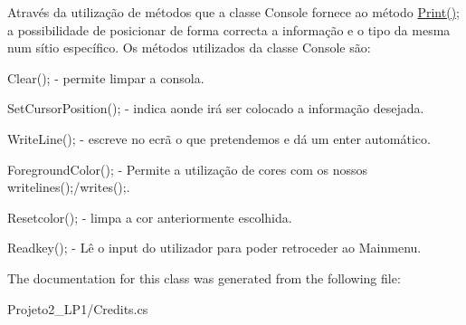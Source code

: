 Através da utilização de métodos que a classe Console fornece ao método \mbox{\hyperlink{class_projeto2___l_p1_1_1_credits_a34a88547053660a821523f26d0d47230}{Print()}}; a possibilidade de posicionar de forma correcta a informação e o tipo da mesma num sítio específico. Os métodos utilizados da classe Console são\+: 


\begin{DoxyItemize}
\item Clear(); -\/ permite limpar a consola.
\item Set\+Cursor\+Position(); -\/ indica aonde irá ser colocado a informação desejada.
\item Write\+Line(); -\/ escreve no ecrã o que pretendemos e dá um enter automático.
\item Foreground\+Color(); -\/ Permite a utilização de cores com os nossos writelines();/writes();.
\item Resetcolor(); -\/ limpa a cor anteriormente escolhida.
\item Readkey(); -\/ Lê o input do utilizador para poder retroceder ao Mainmenu. 
\end{DoxyItemize}

The documentation for this class was generated from the following file\+:\begin{DoxyCompactItemize}
\item 
Projeto2\+\_\+\+L\+P1/Credits.\+cs\end{DoxyCompactItemize}
